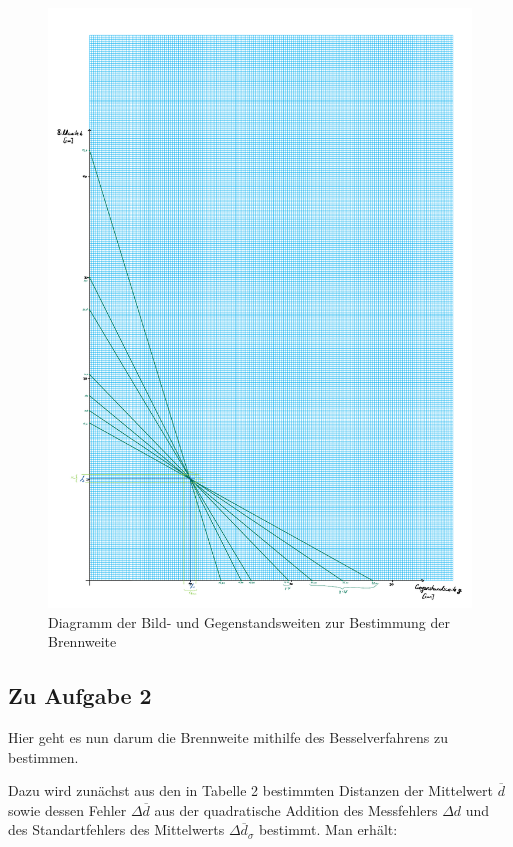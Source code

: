 \documentclass{article}
\begin{document}
\begin{figure} [p]
    \centering
    \includegraphics[width=\textwidth]{graphics/dia2.pdf}
    \caption{Diagramm der Bild- und Gegenstandsweiten zur Bestimmung der Brennweite}
\end{figure}

\newpage

\subsection{Zu Aufgabe 2}

Hier geht es nun darum die Brennweite mithilfe des Besselverfahrens zu bestimmen.

Dazu wird zunächst aus den in Tabelle 2 bestimmten Distanzen der Mittelwert $\overline{d}$ sowie dessen Fehler $\Delta \overline{d}$ aus der quadratische Addition des Messfehlers $\Delta d$ und des Standartfehlers des Mittelwerts $\Delta \overline{d}_{\sigma}$ bestimmt. Man erhält:
\end{document}
